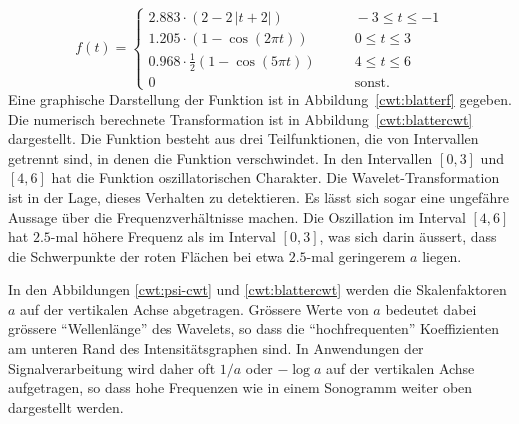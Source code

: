 \begin{beispiel}
\begin{equation}
f(t) = \begin{cases}
2.883 \cdot (2 - 2\,|t+2|)&\qquad -3\le t \le -1\\
1.205\cdot (1-\cos(2\pi t))&\qquad 0\le t \le 3\\
0.968\cdot \frac12(1-\cos(5\pi t))&\qquad 4\le t \le 6\\
0&\qquad\text{sonst.}
\end{cases}
\label{cwt:blatterf}
\end{equation}
Eine graphische Darstellung der Funktion ist in Abbildung~\ref{cwt:blatterf}
gegeben.
Die numerisch berechnete Transformation ist in Abbildung~\ref{cwt:blattercwt}
dargestellt.
Die Funktion besteht aus drei Teilfunktionen, die von Intervallen getrennt sind,
in denen die Funktion verschwindet.
In den Intervallen $[0,3]$ und $[4,6]$ hat die Funktion oszillatorischen
Charakter.
Die Wavelet-Transformation ist in der Lage, dieses Verhalten zu detektieren.
Es lässt sich sogar eine ungefähre Aussage über die Frequenzverhältnisse
machen.
Die Oszillation im Interval $[4,6]$ hat $2.5$-mal höhere Frequenz als im
Interval $[0,3]$, was sich darin äussert, dass die Schwerpunkte der roten
Flächen bei etwa $2.5$-mal geringerem $a$ liegen.
\end{beispiel}

In den Abbildungen \ref{cwt:psi-cwt} und \ref{cwt:blattercwt} werden 
die Skalenfaktoren $a$ auf der vertikalen Achse abgetragen.
Grössere Werte von $a$ bedeutet dabei grössere ``Wellenlänge'' des Wavelets,
so dass die ``hochfrequenten'' Koeffizienten am unteren Rand des
Intensitätsgraphen sind.
In Anwendungen der Signalverarbeitung wird daher oft $1/a$ oder $-\log a$ 
auf der vertikalen Achse aufgetragen, so dass hohe Frequenzen wie in
einem Sonogramm weiter oben dargestellt werden.

